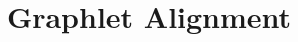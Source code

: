 \documentclass[11pt,a4paper]{article}
\title{Graphlet Alignment}
\date{}
\begin{document}
\maketitle

\begin{abstract}
\end{abstract}




%
%







\end{document}
